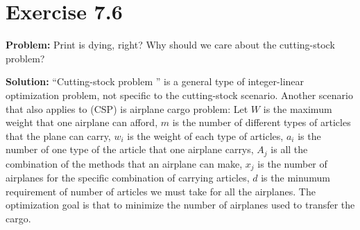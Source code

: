 \section{Exercise 7.6}
\textbf{Problem:} Print is dying, right? Why should we care about the cutting-stock problem?

\textbf{Solution:} ``Cutting-stock problem '' is a general type of integer-linear optimization problem, not specific to the cutting-stock scenario. Another scenario that also applies to (CSP) is airplane cargo problem: Let $W$ is the maximum weight that one airplane can afford, $m$ is the number of different types of articles that the plane can carry, $w_i$ is the weight of each type of articles, $a_i$ is the number of one type of the article that one airplane carrys, $A_j$ is all the combination of the methods that an airplane can make, $x_j$ is the number of airplanes for the specific combination of carrying articles, $d$ is the minumum requirement of number of articles we must take for all the airplanes. The optimization goal is that to minimize the number of airplanes used to transfer the cargo.